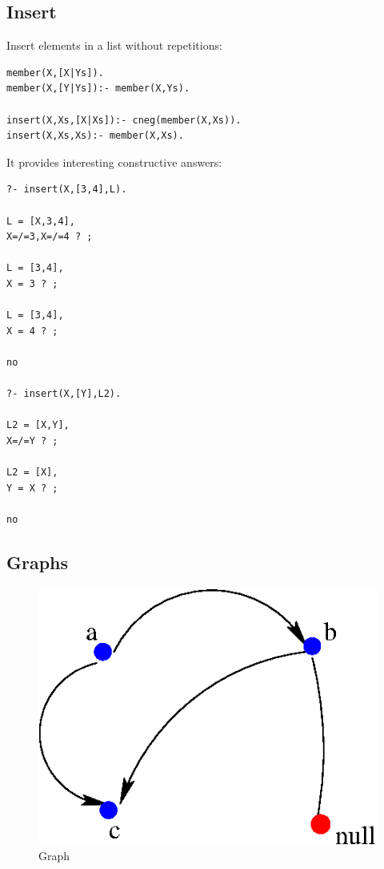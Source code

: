 \documentclass{tlp}
\begin{document}
\subsection*{Insert}

Insert elements in a list without repetitions:
\begin{small}
\begin{verbatim}
member(X,[X|Ys]).
member(X,[Y|Ys]):- member(X,Ys).

insert(X,Xs,[X|Xs]):- cneg(member(X,Xs)).
insert(X,Xs,Xs):- member(X,Xs).
\end{verbatim}
\end{small}
It provides interesting constructive answers:
\begin{small}
\begin{verbatim}
?- insert(X,[3,4],L).

L = [X,3,4],
X=/=3,X=/=4 ? ;

L = [3,4],
X = 3 ? ;

L = [3,4],
X = 4 ? ;

no

?- insert(X,[Y],L2).

L2 = [X,Y],
X=/=Y ? ;

L2 = [X],
Y = X ? ;

no
\end{verbatim}
\end{small}

\subsection*{Graphs}

\begin{figure}
        \begin{center}
                \includegraphics[totalheight=4.3 cm]{graph.eps}
        \end{center}
        \caption{Graph}
        \label{fig:graph}
\end{figure}
\end{document}
